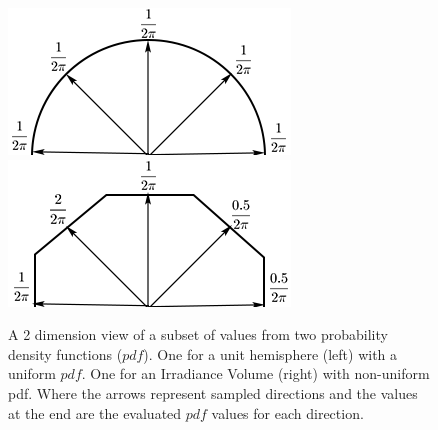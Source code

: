 \documentclass[../dissertation.tex]{subfiles}
\begin{document}
\begin{figure}[h]
\centering
{}
  \includegraphics[width=\textwidth]{images/uniform_pdf.png}   
  \label{fig:uniform_pdf}
\endminipage\hspace{5em}
  \includegraphics[width=\textwidth]{images/not_uniform_pdf.png}
  \label{fig:not_uniform_pdf}
\endminipage
\caption{A 2 dimension view of a subset of values from two probability density functions ($pdf$). One for a unit hemisphere (left) with a uniform $pdf$. One for an Irradiance Volume (right) with non-uniform pdf. Where the arrows represent sampled directions and the values at the end are the evaluated $pdf$ values for each direction.}
\label{fig:pdfs}
\end{figure}
\end{document}
